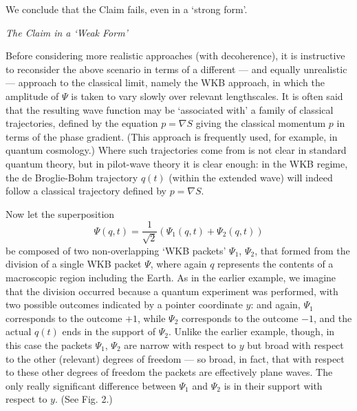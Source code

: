 \documentclass{article}%
\begin{document}
We conclude that the Claim fails, even in a `strong form'.

\begin{center}
\textit{The Claim in a `Weak Form'}
\end{center}

Before considering more realistic approaches (with decoherence), it is
instructive to reconsider the above scenario in terms of a different --- and
equally unrealistic --- approach to the classical limit, namely the WKB
approach, in which the amplitude of $\Psi$ is taken to vary slowly over
relevant lengthscales. It is often said that the resulting wave function may
be `associated with' a family of classical trajectories, defined by the
equation $p=\nabla S$ giving the classical momentum $p$ in terms of the phase
gradient. (This approach is frequently used, for example, in quantum
cosmology.) Where such trajectories come from is not clear in standard quantum
theory, but in pilot-wave theory it is clear enough: in the WKB regime, the de
Broglie-Bohm trajectory $q(t)$ (within the extended wave) will indeed follow a
classical trajectory defined by $p=\nabla S$.

Now let the superposition%
\[
\Psi(q,t)=\frac{1}{\sqrt{2}}\left(  \Psi_{1}(q,t)+\Psi_{2}(q,t)\right)
\]
be composed of two non-overlapping `WKB packets' $\Psi_{1}$, $\Psi_{2}$, that
formed from the division of a single WKB packet $\Psi$, where again $q$
represents the contents of a macroscopic region including the Earth. As in the
earlier example, we imagine that the division occurred because a quantum
experiment was performed, with two possible outcomes indicated by a pointer
coordinate $y$: and again, $\Psi_{1}$ corresponds to the outcome $+1$, while
$\Psi_{2}$ corresponds to the outcome $-1$, and the actual $q(t)$ ends in the
support of $\Psi_{2}$. Unlike the earlier example, though, in this case the
packets $\Psi_{1}$, $\Psi_{2}$ are narrow with respect to $y$ but broad with
respect to the other (relevant) degrees of freedom --- so broad, in fact, that
with respect to these other degrees of freedom the packets are effectively
plane waves. The only really significant difference between $\Psi_{1}$ and
$\Psi_{2}$ is in their support with respect to $y$. (See Fig. 2.)%
\end{document}
